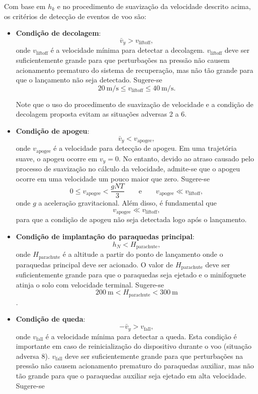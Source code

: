 \documentclass[12pt,a4paper]{article}
\begin{document}
Com base em $h_k$ e no procedimento de suavização da velocidade descrito acima, os critérios de detecção de eventos de voo são:
\begin{itemize}
	\item \textbf{Condição de decolagem}:
	\begin{equation}
	\bar{v}_y>v_\text{liftoff},
	\end{equation}
	onde $v_\text{liftoff}$ é a velocidade mínima para detectar a decolagem. $v_\text{liftoff}$ deve ser suficientemente grande para que perturbações na pressão não causem acionamento prematuro do sistema de recuperação, mas não tão grande para que o lançamento não seja detectado. Sugere-se  
	\[20~\text{m/s} \le v_\text{liftoff}\le 40~\text{m/s}.\]
	
	Note que o uso do procedimento de suavização de velocidade e a condição de decolagem proposta evitam as situações adversas 2 a 6.
	\item \textbf{Condição de apogeu}:
	\begin{equation}
	\bar{v}_y<v_\text{apogee},
	\end{equation}
	onde $v_\text{apogee}$ é a velocidade para detecção de apogeu. Em uma trajetória suave, o apogeu ocorre em $v_y=0$. No entanto, devido ao atraso causado pelo processo de suavização no cálculo da velocidade, admite-se que o apogeu ocorre em uma velocidade um pouco maior que zero. Sugere-se 
	\[0 \le v_\text{apogee}<\frac{gNT}{3}\qquad \text{e} \qquad v_\text{apogee} \ll v_\text{liftoff},\]
	onde $g$ a aceleração gravitacional. Além disso, é fundamental que
	\[ v_\text{apogee} \ll v_\text{liftoff}, \]
	para que a condição de apogeu não seja detectada logo após o lançamento.
	\item \textbf{Condição de implantação do paraquedas principal}:
	\begin{equation}
	h_N<H_\text{parachute},
	\end{equation}
	onde $H_\text{parachute}$ é a altitude a partir do ponto de lançamento onde o paraquedas principal deve ser acionado. O valor de $H_\text{parachute}$ deve ser suficientemente grande para que o paraquedas seja ejetado e o minifoguete atinja o solo com velocidade terminal. Sugere-se
	\[200~\text{m}< H_\text{parachute} < 300~\text{m}\].
	\item \textbf{Condição de queda}:
	\begin{equation}
	-\bar{v}_y>v_\text{fall},
	\end{equation}
	onde $v_\text{fall}$ é a velocidade mínima para detectar a queda. Esta condição é importante em caso de reinicialização do dispositivo durante o voo (situação adversa 8). $v_\text{fall}$ deve ser suficientemente grande para que perturbações na pressão não causem acionamento prematuro do paraquedas auxiliar, mas não tão grande para que o paraquedas auxiliar seja ejetado em alta velocidade. Sugere-se  

\end{itemize}
\end{document}
